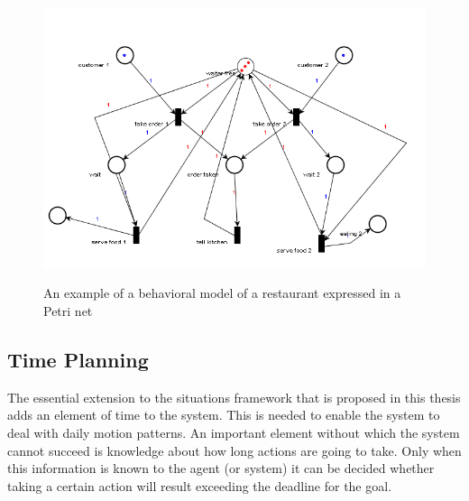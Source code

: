 \documentclass[11pt]{book}
\begin{document}
\begin{figure}
\begin{center}
\includegraphics[width=450pt]{restaurant.png}
\label{restaurantnet}
\end{center}
\caption{An example of a behavioral model of a restaurant expressed in a Petri net}

\end{figure}

\subsection{Time Planning}
The essential extension to the situations framework that is proposed in this thesis adds an element of time to the system. This is needed to enable the system to deal with daily motion patterns. An important element without which the system cannot succeed is knowledge about how long actions are going to take. Only when this information is known to the agent (or system) it can be decided whether taking a certain action will result exceeding the deadline for the goal.
\end{document}
